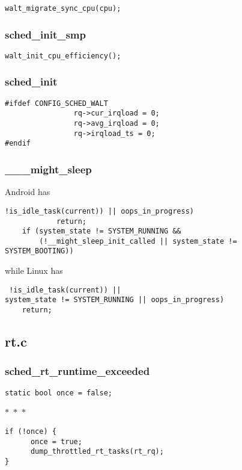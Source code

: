 \documentclass{article}
\newcommand{\divider}{{\begin{center}
  $\ast$~$\ast$~$\ast$
\end{center}}}
\begin{document}
\begin{verbatim}
walt_migrate_sync_cpu(cpu);
\end{verbatim}

\subsubsection{sched\_init\_smp}

\begin{verbatim}
walt_init_cpu_efficiency();
\end{verbatim}

\subsubsection{sched\_init}

\begin{verbatim}
#ifdef CONFIG_SCHED_WALT
                rq->cur_irqload = 0;
                rq->avg_irqload = 0;
                rq->irqload_ts = 0;
#endif
\end{verbatim}

\subsubsection{\_\_\_might\_sleep}

Android has
\begin{verbatim}
!is_idle_task(current)) || oops_in_progress)
            return;
    if (system_state != SYSTEM_RUNNING &&
        (!__might_sleep_init_called || system_state != SYSTEM_BOOTING))
\end{verbatim}
while Linux has 
\begin{verbatim}
 !is_idle_task(current)) ||
system_state != SYSTEM_RUNNING || oops_in_progress)
    return;
\end{verbatim}

\subsection{rt.c}

\subsubsection{sched\_rt\_runtime\_exceeded}

\begin{verbatim}
static bool once = false;
\end{verbatim}
\divider
\begin{verbatim}
if (!once) {
      once = true;
      dump_throttled_rt_tasks(rt_rq);
}
\end{verbatim}
\end{document}
